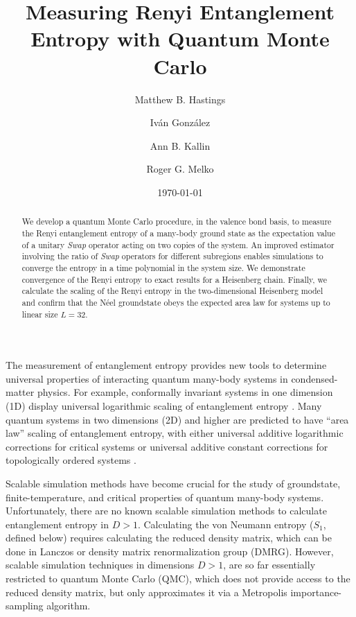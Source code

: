 \documentclass[prl,aps,twocolumn,floatfix,amsmath,amssymb,superscriptaddress,tightenlines]{revtex4}
\begin{document}
\date{\today}
\title{Measuring Renyi Entanglement Entropy with Quantum Monte Carlo}

\author{Matthew B. Hastings}

\author{Iv\'an Gonz\'alez}

\author{Ann B. Kallin}

\author{Roger G. Melko}

\begin{abstract} 


We develop a quantum Monte Carlo procedure, in the valence bond basis, to measure the Renyi entanglement entropy of a
many-body ground state as the expectation value of a unitary {\it Swap} operator acting on two copies of the system.
An improved estimator involving the ratio of {\it Swap} operators for different subregions enables simulations to converge the entropy in a time polynomial in the system size.  We demonstrate convergence of the Renyi entropy to exact results for a Heisenberg chain. Finally, we calculate the scaling of the Renyi entropy in the two-dimensional Heisenberg model and confirm that the N\'eel groundstate obeys the expected area law for systems up to linear size $L=32$.


\end{abstract}
\maketitle

The measurement of entanglement entropy  provides
new tools to determine universal properties of interacting quantum many-body systems in condensed-matter physics.  For example, conformally invariant
systems in one dimension (1D) display universal logarithmic
scaling of entanglement entropy \cite{Cardy}.  Many
quantum systems in two dimensions (2D) and higher are predicted to have ``area law''
scaling of entanglement entropy, with
either universal additive logarithmic corrections for critical systems \cite{corner,ryu} or
universal additive constant corrections for topologically ordered systems \cite{KP,LW}.

Scalable simulation methods have become crucial for the 
study of groundstate, finite-temperature, and critical properties of quantum
many-body systems.
Unfortunately, there are 
no known scalable simulation methods to calculate entanglement entropy in $D>1$.
Calculating the von Neumann entropy ($S_1$, defined below) requires calculating
the reduced density matrix,
which can be done in Lanczos 
or density matrix renormalization group (DMRG).  However, scalable simulation techniques in dimensions $D>1$,
are so far essentially
restricted to quantum Monte Carlo (QMC), which does not provide access to the reduced density matrix, but only approximates it
via a Metropolis importance-sampling algorithm. 
\end{document}

